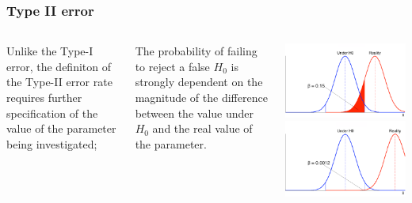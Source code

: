 \documentclass[10pt]{beamer}
\begin{document}
\begin{frame}
  \frametitle{Type II error}

  \begin{columns}

    Unlike the Type-I error, the definiton of the Type-II error rate
    requires further specification of the value of the parameter being
    investigated;

    \bigskip

    The probability of failing to reject a false $H_0$ is strongly
    dependent on the magnitude of the difference between the value
    under $H_0$ and the real value of the parameter.

    \includegraphics[width=1\textwidth]{img/beta-a}\\
    \includegraphics[width=1\textwidth]{img/beta-d}    
  \end{columns}
\end{frame}
\end{document}
